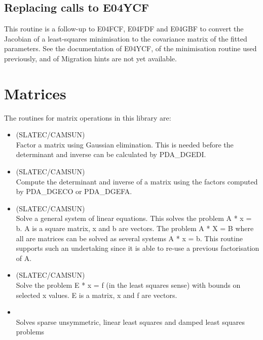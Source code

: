 \documentclass[11pt,twoside,nolof]{starlink}
\begin{document}

\subsection{Replacing calls to E04YCF}

   This routine is a follow-up to E04FCF, E04FDF and E04GBF to convert
   the Jacobian of a least-squares minimisation to the covariance matrix
   of the fitted parameters.
   See the documentation of E04YCF, of the minimisation routine used
   previously, and of
   Migration hints are not yet available.


\section{Matrices}

   The routines for matrix operations in this library are:

\begin{itemize}

\item {} (SLATEC/CAMSUN)\ \\
   Factor a matrix using Gaussian elimination. This is needed before
   the determinant and inverse can be calculated by PDA\_DGEDI.
\item {} (SLATEC/CAMSUN)\ \\
   Compute the determinant and inverse of a matrix using the factors
   computed by PDA\_\-DGECO or PDA\_DGEFA.
\item {} (SLATEC/CAMSUN)\ \\
   Solve a general system of linear equations. This solves the
   problem A * x = b. A is a square matrix, x and b are vectors. The
   problem A * X = B where all are matrices can be solved as several
   systems A * x = b. This routine supports such an undertaking since
   it is able to re-use a previous factorisation of A.
\item {} (SLATEC/CAMSUN)\ \\
   Solve the problem E * x = f (in the least squares sense) with
   bounds on selected x values. E is a matrix, x and f are vectors.
\item {} \\
   Solves sparse unsymmetric, linear least squares and damped least
   squares problems

\end{itemize}
\end{document}
